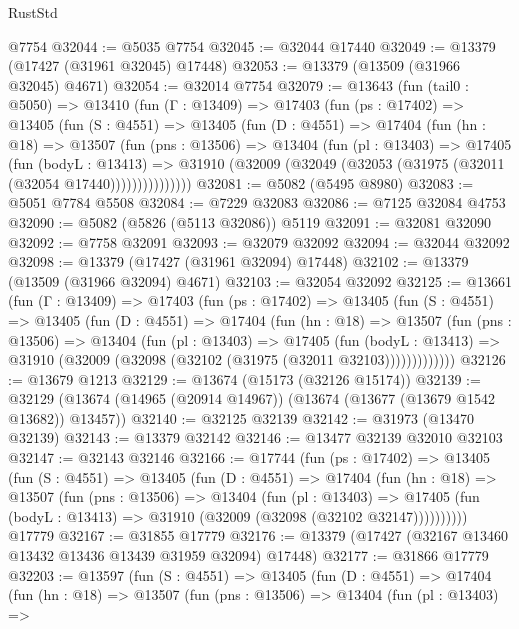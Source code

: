 \begin{lexlean}{RustStd}
\begin{coremodule}
    @7754
@32044 := @5035 @7754
@32045 := @32044 @17440
@32049 := @13379 (@17427 (@31961 @32045) @17448)
@32053 := @13379 (@13509 (@31966 @32045) @4671)
@32054 := @32014 @7754
@32079 := @13643
    (fun (tail0 : @5050) =>
    @13410
      (fun (Γ : @13409) =>
      @17403
        (fun (ps : @17402) =>
        @13405
          (fun (S : @4551) =>
          @13405
            (fun (D : @4551) =>
            @17404
              (fun (hn : @18) =>
              @13507
                (fun (pns : @13506) =>
                @13404
                  (fun (pl : @13403) =>
                  @17405
                    (fun (bodyL : @13413) =>
                    @31910 (@32009 (@32049 (@32053 (@31975 (@32011 (@32054 @17440)))))))))))))))
@32081 := @5082 (@5495 @8980)
@32083 := @5051 @7784 @5508
@32084 := @7229 @32083
@32086 := @7125 @32084 @4753
@32090 := @5082 (@5826 (@5113 @32086)) @5119
@32091 := @32081 @32090
@32092 := @7758 @32091
@32093 := @32079 @32092
@32094 := @32044 @32092
@32098 := @13379 (@17427 (@31961 @32094) @17448)
@32102 := @13379 (@13509 (@31966 @32094) @4671)
@32103 := @32054 @32092
@32125 := @13661
    (fun (Γ : @13409) =>
    @17403
      (fun (ps : @17402) =>
      @13405
        (fun (S : @4551) =>
        @13405
          (fun (D : @4551) =>
          @17404
            (fun (hn : @18) =>
            @13507
              (fun (pns : @13506) =>
              @13404
                (fun (pl : @13403) =>
                @17405
                  (fun (bodyL : @13413) =>
                  @31910 (@32009 (@32098 (@32102 (@31975 (@32011 @32103)))))))))))))
@32126 := @13679 @1213
@32129 := @13674 (@15173 (@32126 @15174))
@32139 := @32129 (@13674 (@14965 (@20914 @14967)) (@13674 (@13677 (@13679 @1542 @13682)) @13457))
@32140 := @32125 @32139
@32142 := @31973 (@13470 @32139)
@32143 := @13379 @32142
@32146 := @13477 @32139 @32010 @32103
@32147 := @32143 @32146
@32166 := @17744
    (fun (ps : @17402) =>
    @13405
      (fun (S : @4551) =>
      @13405
        (fun (D : @4551) =>
        @17404
          (fun (hn : @18) =>
          @13507
            (fun (pns : @13506) =>
            @13404
              (fun (pl : @13403) =>
              @17405 (fun (bodyL : @13413) => @31910 (@32009 (@32098 (@32102 @32147))))))))))
    @17779
@32167 := @31855 @17779
@32176 := @13379 (@17427 (@32167 @13460 @13432 @13436 @13439 @31959 @32094) @17448)
@32177 := @31866 @17779
@32203 := @13597
    (fun (S : @4551) =>
    @13405
      (fun (D : @4551) =>
      @17404
        (fun (hn : @18) =>
        @13507
          (fun (pns : @13506) =>
          @13404
            (fun (pl : @13403) =>

\end{coremodule}
\end{lexlean}
